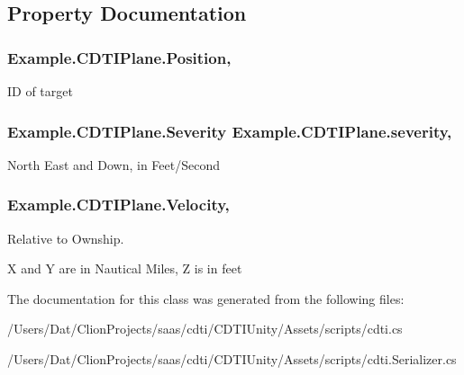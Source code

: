 \subsection{Property Documentation}
\subsubsection[{\texorpdfstring{Position}{Position}}]{ Example.\+C\+D\+T\+I\+Plane.\+Position\hspace{0.3cm}{\ttfamily [get]}, {\ttfamily [set]}}\hypertarget{class_example_1_1_c_d_t_i_plane_a4d6766b3ddf6726e0b6beda5f7044f39}{}\label{class_example_1_1_c_d_t_i_plane_a4d6766b3ddf6726e0b6beda5f7044f39}


ID of target

\subsubsection[{\texorpdfstring{severity}{severity}}]{\setlength{\rightskip}{0pt plus 5cm}Example.\+C\+D\+T\+I\+Plane.\+Severity Example.\+C\+D\+T\+I\+Plane.\+severity\hspace{0.3cm}{\ttfamily [get]}, {\ttfamily [set]}}\hypertarget{class_example_1_1_c_d_t_i_plane_ac51cdc50b63036c15eb1dc03f9d8369c}{}\label{class_example_1_1_c_d_t_i_plane_ac51cdc50b63036c15eb1dc03f9d8369c}


North East and Down, in Feet/\+Second

\subsubsection[{\texorpdfstring{Velocity}{Velocity}}]{ Example.\+C\+D\+T\+I\+Plane.\+Velocity\hspace{0.3cm}{\ttfamily [get]}, {\ttfamily [set]}}\hypertarget{class_example_1_1_c_d_t_i_plane_a52e1d4c9df3e1b3b5f281bbac9e49269}{}\label{class_example_1_1_c_d_t_i_plane_a52e1d4c9df3e1b3b5f281bbac9e49269}




Relative to Ownship.

X and Y are in Nautical Miles, Z is in feet

The documentation for this class was generated from the following files\+:\begin{DoxyCompactItemize}
\item 
/\+Users/\+Dat/\+Clion\+Projects/saas/cdti/\+C\+D\+T\+I\+Unity/\+Assets/scripts/cdti.\+cs\item 
/\+Users/\+Dat/\+Clion\+Projects/saas/cdti/\+C\+D\+T\+I\+Unity/\+Assets/scripts/cdti.\+Serializer.\+cs\end{DoxyCompactItemize}
